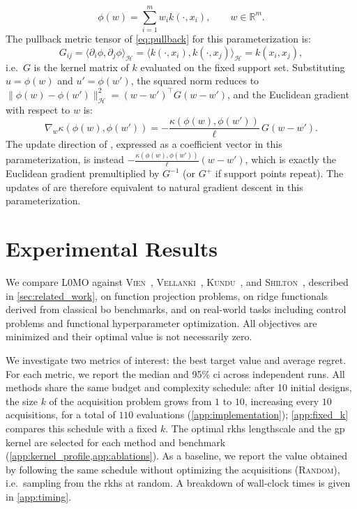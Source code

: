 \documentclass{article}
\newcommand{\wycoff}{\textsc{L0MO}}
\newcommand{\vien}{\textsc{Vien}~\cite{vien2018bayesian}}
\newcommand{\vellanky}{\textsc{Vellanki}~\cite{vellanki2019bayesian}}
\newcommand{\kundu}{\textsc{Kundu}~\cite{kundu2025active}}
\newcommand{\shilton}{\textsc{Shilton}~\cite{shilton2020sequential}}
\newcommand{\random}{\textsc{Random}}
\newcommand{\R}{\mathbb{R}}
\newcommand{\Hs}{\mathcal{H}}
\newcommand{\norm}[1]{\lVert #1 \rVert}
\newcommand{\inner}[2]{\langle #1, #2 \rangle}
\newcommand{\kernelH}{k}
\newcommand{\kernelGP}{\kappa}
\newcommand{\vu}{u}
\begin{document}
\begin{equation}
    \phi(w) = \sum_{i=1}^m w_i \kernelH(\cdot, x_i), \qquad w \in \R^m.
\end{equation}
The pullback metric tensor of \cref{eq:pullback} for this parameterization is:
\begin{equation}
    G_{ij} = \inner{\partial_i \phi}{\partial_j \phi}_\Hs = \inner{\kernelH(\cdot, x_i)}{\kernelH(\cdot, x_j)}_\Hs = \kernelH(x_i, x_j),
\end{equation}
i.e.\ $G$ is the kernel matrix of $\kernelH$ evaluated on the fixed support set. Substituting $\vu = \phi(w)$ and $\vu' = \phi(w')$, the squared norm reduces to $\norm{\phi(w) - \phi(w')}_\Hs^2 = (w - w')^\top G (w - w')$, and the Euclidean gradient with respect to $w$ is:
\begin{equation}
    \nabla_w \kernelGP(\phi(w), \phi(w')) = -\frac{\kernelGP(\phi(w), \phi(w'))}{\ell} \, G(w - w').
\end{equation}
The update direction of \cite{vien2018bayesian}, expressed as a coefficient vector in this parameterization, is instead $-\frac{\kernelGP(\phi(w), \phi(w'))}{\ell}(w - w')$, which is exactly the Euclidean gradient premultiplied by $G^{-1}$ (or $G^{+}$ if support points repeat). The updates of \cite{vien2018bayesian} are therefore equivalent to natural gradient descent in this parameterization.

\section{Experimental Results}
\label{sec:experiments}

We compare \wycoff{} against \vien, \vellanky, \kundu, and \shilton, described in \cref{sec:related_work}, on function projection problems, on ridge functionals derived from classical \gls{bo} benchmarks, and on real-world tasks including control problems and functional hyperparameter optimization.
All objectives are minimized and their optimal value is not necessarily zero.

We investigate two metrics of interest: the best target value and average regret.
For each metric, we report the median and 95\% \gls{ci} across independent runs.
All methods share the same budget and complexity schedule: after 10 initial designs, the size $k$ of the acquisition problem grows from $1$ to $10$, increasing every $10$ acquisitions, for a total of $110$ evaluations (\cref{app:implementation}); \cref{app:fixed_k} compares this schedule with a fixed $k$.
The optimal \gls{rkhs} lengthscale and the \gls{gp} kernel are selected for each method and benchmark (\cref{app:kernel_profile,app:ablations}).
As a baseline, we report the value obtained by following the same schedule without optimizing the acquisitions (\random), i.e.\ sampling from the \gls{rkhs} at random.
A breakdown of wall-clock times is given in \cref{app:timing}.
\end{document}
